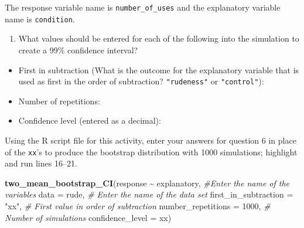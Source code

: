 \documentclass[
]{report}
\newenvironment{Shaded}{\begin{snugshade}}{\end{snugshade}}
\newcommand{\AttributeTok}[1]{\textcolor[rgb]{0.13,0.29,0.53}{#1}}
\newcommand{\CommentTok}[1]{\textcolor[rgb]{0.56,0.35,0.01}{\textit{#1}}}
\newcommand{\DecValTok}[1]{\textcolor[rgb]{0.00,0.00,0.81}{#1}}
\newcommand{\FunctionTok}[1]{\textcolor[rgb]{0.13,0.29,0.53}{\textbf{#1}}}
\newcommand{\NormalTok}[1]{#1}
\newcommand{\SpecialCharTok}[1]{\textcolor[rgb]{0.81,0.36,0.00}{\textbf{#1}}}
\newcommand{\StringTok}[1]{\textcolor[rgb]{0.31,0.60,0.02}{#1}}
\providecommand{\tightlist}{%
  \setlength{\itemsep}{0pt}\setlength{\parskip}{0pt}}
\begin{document}
The response variable name is \texttt{number\_of\_uses} and the explanatory variable name is \texttt{condition}.

\begin{enumerate}
\def\labelenumi{\arabic{enumi}.}
\setcounter{enumi}{5}
\tightlist
\item
  What values should be entered for each of the following into the simulation to create a 99\% confidence interval?
  \vspace{.5mm}
\end{enumerate}

\begin{itemize}
\tightlist
\item
  First in subtraction (What is the outcome for the explanatory variable that is used as first in the order of subtraction? \texttt{"rudeness"} or \texttt{"control"}):
\end{itemize}

\vspace{.15in}

\begin{itemize}
\tightlist
\item
  Number of repetitions:
\end{itemize}

\vspace{.15in}

\begin{itemize}
\tightlist
\item
  Confidence level (entered as a decimal):
\end{itemize}

\vspace{.15in}

Using the R script file for this activity, enter your answers for question 6 in place of the \texttt{xx}'s to produce the bootstrap distribution with 1000 simulations; highlight and run lines 16--21.

\begin{Shaded}
\begin{Highlighting}[]
\FunctionTok{two\_mean\_bootstrap\_CI}\NormalTok{(response }\SpecialCharTok{\textasciitilde{}}\NormalTok{ explanatory, }\CommentTok{\#Enter the name of the variables}
                      \AttributeTok{data =}\NormalTok{ rude,  }\CommentTok{\# Enter the name of the data set}
                      \AttributeTok{first\_in\_subtraction =} \StringTok{"xx"}\NormalTok{, }\CommentTok{\# First value in order of subtraction}
                      \AttributeTok{number\_repetitions =} \DecValTok{1000}\NormalTok{,  }\CommentTok{\# Number of simulations}
                      \AttributeTok{confidence\_level =}\NormalTok{ xx)}
\end{Highlighting}
\end{Shaded}
\end{document}
